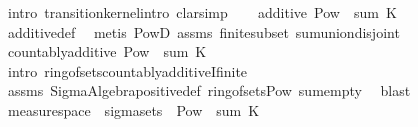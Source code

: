 \begin{isabellebody}
%
\isadelimproof
%
\endisadelimproof
%
\isatagproof
{}\isamarkupfalse%
\ {\isacharparenleft}{\kern0pt}intro\ transition{\isacharunderscore}{\kern0pt}kernel{\isachardot}{\kern0pt}intro{\isacharsemicolon}{\kern0pt}\ clarsimp{\isacharparenright}{\kern0pt}\isanewline
\ \ \isamarkupfalse%
\ {\isachardoublequoteopen}additive\ {\isacharparenleft}{\kern0pt}Pow\ {\isasymOmega}\ {\isacharparenleft}{\kern0pt}sum\ {\isacharparenleft}{\kern0pt}K\ {\isasymomega}{\isacharparenright}{\kern0pt}{\isacharparenright}{\kern0pt}{\isachardoublequoteclose}\ \ {\isasymomega}\isanewline
\ \ \ \ \isamarkupfalse%
\ additive{\isacharunderscore}{\kern0pt}def\ \isamarkupfalse%
\ {\isacharparenleft}{\kern0pt}metis\ PowD\ assms\ finite{\isacharunderscore}{\kern0pt}subset\ sum{\isachardot}{\kern0pt}union{\isacharunderscore}{\kern0pt}disjoint{\isacharparenright}{\kern0pt}\isanewline
\ \ \isamarkupfalse%
\ \isamarkupfalse%
\ {\isachardoublequoteopen}countably{\isacharunderscore}{\kern0pt}additive\ {\isacharparenleft}{\kern0pt}Pow\ {\isasymOmega}\ {\isacharparenleft}{\kern0pt}sum\ {\isacharparenleft}{\kern0pt}K\ {\isasymomega}{\isacharparenright}{\kern0pt}{\isacharparenright}{\kern0pt}{\isachardoublequoteclose}\ \ {\isasymomega}\isanewline
\ \ \ \ \isamarkupfalse%
\ {\isacharparenleft}{\kern0pt}intro\ ring{\isacharunderscore}{\kern0pt}of{\isacharunderscore}{\kern0pt}sets{\isachardot}{\kern0pt}countably{\isacharunderscore}{\kern0pt}additiveI{\isacharunderscore}{\kern0pt}finite{\isacharparenright}{\kern0pt}\isanewline
\ \ \ \ \isamarkupfalse%
\ assms\ Sigma{\isacharunderscore}{\kern0pt}Algebra{\isachardot}{\kern0pt}positive{\isacharunderscore}{\kern0pt}def\ ring{\isacharunderscore}{\kern0pt}of{\isacharunderscore}{\kern0pt}sets{\isacharunderscore}{\kern0pt}Pow\ sum{\isachardot}{\kern0pt}empty\ \isamarkupfalse%
\ blast{\isacharplus}{\kern0pt}\isanewline
\ \ \isamarkupfalse%
\ \isamarkupfalse%
\ {\isachardoublequoteopen}measure{\isacharunderscore}{\kern0pt}space\ {\isasymOmega}\ {\isacharparenleft}{\kern0pt}sigma{\isacharunderscore}{\kern0pt}sets\ {\isasymOmega}\ {\isacharparenleft}{\kern0pt}Pow\ {\isasymOmega}\ {\isacharparenleft}{\kern0pt}sum\ {\isacharparenleft}{\kern0pt}K\ {\isasymomega}{\isacharparenright}{\kern0pt}{\isacharparenright}{\kern0pt}{\isachardoublequoteclose}\ \ {\isasymomega}\isanewline

\end{isabellebody}
